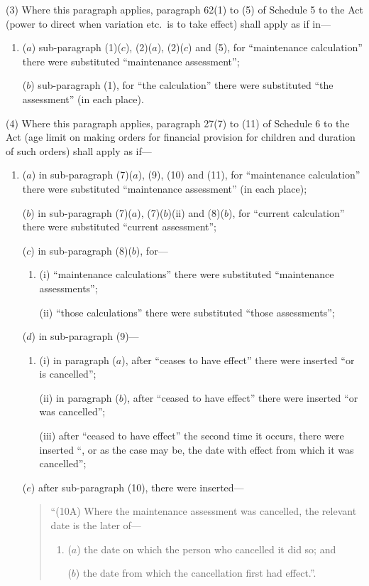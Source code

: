 \documentclass[12pt,a4paper]{article}
\begin{document}
(3) Where this paragraph applies, paragraph 62(1) to (5) of Schedule 5 to the Act (power to direct when variation etc.\ is to take effect) shall apply as if in—
\begin{enumerate}\item[]
($a$) sub-paragraph (1)($c$), (2)($a$), (2)($c$)  and (5), for “maintenance calculation” there were substituted “maintenance assessment”;

($b$) sub-paragraph (1), for “the calculation” there were substituted “the assessment” (in each place).
\end{enumerate}

(4) Where this paragraph applies, paragraph 27(7) to (11) of Schedule 6 to the Act (age limit on making orders for financial provision for children and duration of such orders) shall apply as if—
\begin{enumerate}\item[]
($a$) in sub-paragraph (7)($a$), (9), (10) and (11), for “maintenance calculation” there were substituted “maintenance assessment” (in each place);

($b$) in sub-paragraph (7)($a$), (7)($b$)(ii)  and (8)($b$), for “current calculation” there were substituted “current assessment”;

($c$) in sub-paragraph (8)($b$), for—
\begin{enumerate}\item[]
(i) “maintenance calculations” there were substituted “maintenance assessments”;

(ii) “those calculations” there were substituted “those assessments”;
\end{enumerate}

($d$) in sub-paragraph (9)—
\begin{enumerate}\item[]
(i) in paragraph ($a$), after “ceases to have effect” there were inserted “or is cancelled”;

(ii) in paragraph ($b$), after “ceased to have effect” there were inserted “or was cancelled”;

(iii) after “ceased to have effect” the second time it occurs, there were inserted “, or as the case may be, the date with effect from which it was cancelled”;
\end{enumerate}

($e$) after sub-paragraph (10), there were inserted—
\begin{quotation}
“(10A) Where the maintenance assessment was cancelled, the relevant date is the later of—
\begin{enumerate}\item[]
($a$) the date on which the person who cancelled it did so; and

($b$) the date from which the cancellation first had effect.”.
\end{enumerate}
\end{quotation}
\end{enumerate}
\end{document}

